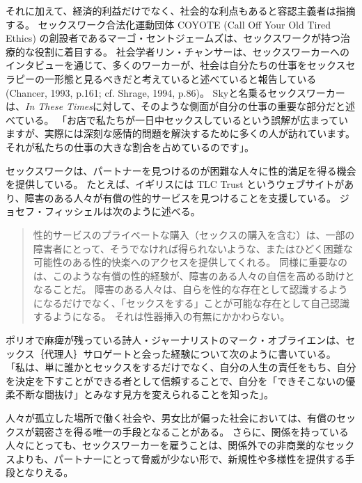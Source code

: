 \documentclass[paper=a4,book,openany]{jlreq}
\newcommand{\ig}[1]{}           %
\begin{document}
それに加えて、経済的利益だけでなく、社会的な利点もあると容認主義者は指摘する。
セックスワーク合法化運動団体 COYOTE (Call Off Your Old Tired Ethics) の創設者であるマーゴ・セントジェームズは、セックスワークが持つ治療的な役割に着目する。
社会学者リン・チャンサーは、セックスワーカーへのインタビューを通じて、多くのワーカーが、社会は自分たちの仕事をセックスセラピーの一形態と見るべきだと考えていると述べていると報告している(Chancer, 1993, p.161; cf. Shrage, 1994, p.86)。
\nocite{chancer93:_prost_femin_theor_ambiv}\nocite{shrage93:_moral_dilem_femin}
Skyと名乗るセックスワーカーは、\emph{In These Times}に対して、そのような側面が自分の仕事の重要な部分だと述べている。
「お店で私たちが一日中セックスしているという誤解が広まっていますが、実際には深刻な感情的問題を解決するために多くの人が訪れています。
それが私たちの仕事の大きな割合を占めているのです」\citep{weisman18:_when_sex_worker_do_labor_therap}。

セックスワークは、パートナーを見つけるのが困難な人々に性的満足を得る機会を提供している。
たとえば、イギリスには TLC Trust というウェブサイトがあり、障害のある人々が有償の性的サービスを見つけることを支援している\ig{\footnote{\url{http://tlc-trust.org.uk/}.}}。
ジョセフ・フィッシェルは次のように述べる。

\begin{quote}

性的サービスのプライベートな購入（セックスの購入を含む）は、一部の障害者にとって、そうでなければ得られないような、またはひどく困難な可能性のある性的快楽へのアクセスを提供してくれる。
同様に重要なのは、このような有償の性的経験が、障害のある人々の自信を高める助けとなることだ。
障害のある人々は、自らを性的な存在として認識するようになるだけでなく、「セックスをする」ことが可能な存在として自己認識するようになる。
それは性器挿入の有無にかかわらない。
\citep[p.220]{fischel18:screwconsent}
\end{quote}

ポリオで麻痺が残っている詩人・ジャーナリストのマーク・オブライエンは、セックス｛代理人｝{サロゲート}と会った経験について次のように書いている。
「私は、単に誰かとセックスをするだけでなく、自分の人生の責任をもち、自分を決定を下すことができる者として信頼することで、自分を「できそこないの優柔不断な間抜け」とみなす見方を変えられることを知った」\citep{obrien90:_seein_sex_surrog}。

人々が孤立した場所で働く社会や、男女比が偏った社会においては、有償のセックスが親密さを得る唯一の手段となることがある。
さらに、関係を持っている人々にとっても、セックスワーカーを雇うことは、関係外での非商業的なセックスよりも、パートナーにとって脅威が少ない形で、新規性や多様性を提供する手段となりえる\citep{mesko12:_effec_prost_stabil_roman_relat}。
\end{document}

